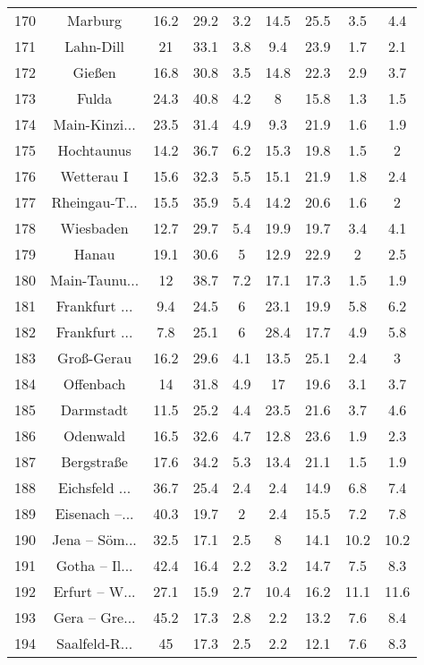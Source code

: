 \begin{table}[!htbp]
\begin{tabular}{@{\extracolsep{5pt}} ccccccccc}
170 & Marburg & 16.2 & 29.2 & 3.2 & 14.5 & 25.5 & 3.5 & 4.4 \\ 
171 & Lahn-Dill & 21 & 33.1 & 3.8 & 9.4 & 23.9 & 1.7 & 2.1 \\ 
172 & Gießen & 16.8 & 30.8 & 3.5 & 14.8 & 22.3 & 2.9 & 3.7 \\ 
173 & Fulda & 24.3 & 40.8 & 4.2 & 8 & 15.8 & 1.3 & 1.5 \\ 
174 & Main-Kinzi... & 23.5 & 31.4 & 4.9 & 9.3 & 21.9 & 1.6 & 1.9 \\ 
175 & Hochtaunus & 14.2 & 36.7 & 6.2 & 15.3 & 19.8 & 1.5 & 2 \\ 
176 & Wetterau I & 15.6 & 32.3 & 5.5 & 15.1 & 21.9 & 1.8 & 2.4 \\ 
177 & Rheingau-T... & 15.5 & 35.9 & 5.4 & 14.2 & 20.6 & 1.6 & 2 \\ 
178 & Wiesbaden & 12.7 & 29.7 & 5.4 & 19.9 & 19.7 & 3.4 & 4.1 \\ 
179 & Hanau & 19.1 & 30.6 & 5 & 12.9 & 22.9 & 2 & 2.5 \\ 
180 & Main-Taunu... & 12 & 38.7 & 7.2 & 17.1 & 17.3 & 1.5 & 1.9 \\ 
181 & Frankfurt ... & 9.4 & 24.5 & 6 & 23.1 & 19.9 & 5.8 & 6.2 \\ 
182 & Frankfurt ... & 7.8 & 25.1 & 6 & 28.4 & 17.7 & 4.9 & 5.8 \\ 
183 & Groß-Gerau & 16.2 & 29.6 & 4.1 & 13.5 & 25.1 & 2.4 & 3 \\ 
184 & Offenbach & 14 & 31.8 & 4.9 & 17 & 19.6 & 3.1 & 3.7 \\ 
185 & Darmstadt & 11.5 & 25.2 & 4.4 & 23.5 & 21.6 & 3.7 & 4.6 \\ 
186 & Odenwald & 16.5 & 32.6 & 4.7 & 12.8 & 23.6 & 1.9 & 2.3 \\ 
187 & Bergstraße & 17.6 & 34.2 & 5.3 & 13.4 & 21.1 & 1.5 & 1.9 \\ 
188 & Eichsfeld ... & 36.7 & 25.4 & 2.4 & 2.4 & 14.9 & 6.8 & 7.4 \\ 
189 & Eisenach –... & 40.3 & 19.7 & 2 & 2.4 & 15.5 & 7.2 & 7.8 \\ 
190 & Jena – Söm... & 32.5 & 17.1 & 2.5 & 8 & 14.1 & 10.2 & 10.2 \\ 
191 & Gotha – Il... & 42.4 & 16.4 & 2.2 & 3.2 & 14.7 & 7.5 & 8.3 \\ 
192 & Erfurt – W... & 27.1 & 15.9 & 2.7 & 10.4 & 16.2 & 11.1 & 11.6 \\ 
193 & Gera – Gre... & 45.2 & 17.3 & 2.8 & 2.2 & 13.2 & 7.6 & 8.4 \\ 
194 & Saalfeld-R... & 45 & 17.3 & 2.5 & 2.2 & 12.1 & 7.6 & 8.3 \\ 

\end{tabular}
\end{table}
